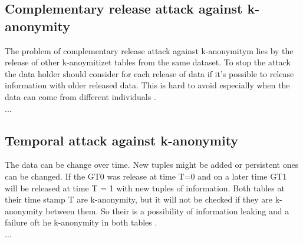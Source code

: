 \documentclass{llncs}
\begin{document}
\subsection{Complementary release attack against k-anonymity}

The problem of complementary release attack against k-anonymitym lies by the release of other k-anoymitizet tables from the same dataset. To stop the attack the data holder should consider for each release of data if it's possible to release information with older released data. This is hard to avoid especially when the data can come from different individuals \cite{sweeney2002k}.
\\...
\subsection{Temporal attack against k-anonymity}

The data can be change over time. New tuples might be added or persistent ones can be changed. If the GT0 was release at time T=0 and on a later time GT1 will be released at time T = 1 with new tuples of information. Both tables at their time stamp T are k-anonymity, but it will not be checked if they are k-anonymity between them. So their is a possibility of information leaking and a failure oft he k-anonymity in both tables \cite{sweeney2002k}.
\\...
\end{document}
